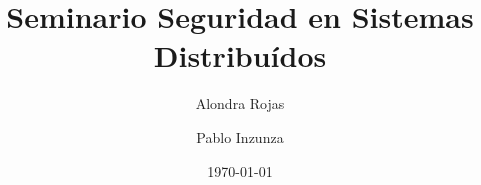 \documentclass[spanish, a4paper]{article}
\title{Seminario Seguridad en Sistemas Distribuídos}
\author{Alondra Rojas \and Pablo Inzunza}
\date{\today}
\begin{document}
\maketitle
\begin{abstract}
\end{abstract}





\end{document}
